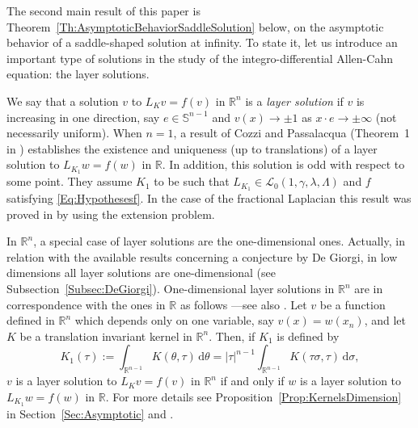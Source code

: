 \documentclass[12pt,reqno]{amsart}
\theoremstyle{definition}
\theoremstyle{remark}
\newcommand{\con}[1]{\mathbb{#1}}
\newcommand{\R}{\con{R}} %
\newcommand{\Sph}{\con{S}} %
\newcommand{\lcal}{\mathcal{L}}
\newcommand{\s}{\gamma}
\renewcommand{\d}{\,\mathrm{d}} %
\numberwithin{equation}{section}
\begin{document}
The second main result of this paper is Theorem~\ref{Th:AsymptoticBehaviorSaddleSolution} below, on the asymptotic behavior of a saddle-shaped solution at infinity. To state it, let us introduce an important type of solutions in the study of the integro-differential Allen-Cahn equation: the layer solutions.


We say that a solution $v$ to $L_K v = f(v)$ in $\R^n$ is a \emph{layer solution} if $v$ is increasing in one direction, say $e\in \Sph^{n-1}$ and $v(x) \to \pm 1$ as $x\cdot e \to \pm \infty$ (not necessarily uniform). When $n=1$, a result of Cozzi and Passalacqua (Theorem~1 in \cite{CozziPassalacqua}) establishes the existence and uniqueness (up to translations) of a layer solution to  $L_{K_1} w = f(w)$ in $\R$. In addition, this solution is odd with respect to some point. They assume $K_1$ to be such that $L_{K_1}\in \lcal_0(1,\s,\lambda, \Lambda)$ and $f$ satisfying \eqref{Eq:Hypothesesf}. In the case of the fractional Laplacian this result was proved in \cite{CabreSolaMorales,CabreSireII} by using the extension problem.

In $\R^n$, a special case of layer solutions are the one-dimensional ones. Actually, in relation with the available results concerning a conjecture by De Giorgi, in low dimensions all layer solutions are one-dimensional (see Subsection~\ref{Subsec:DeGiorgi}). One-dimensional layer solutions in $\R^n$ are in correspondence with the ones in $\R$ as follows ---see also \cite{CozziPassalacqua}. Let $v$ be a function defined in $\R^n$ which depends only on one variable, say $v(x) = w(x_n)$, and let $K$ be a translation invariant kernel in $\R^n$. Then, if $K_1$ is defined by
$$
K_1(\tau) := \int_{\R^{n-1}} K\left(\theta,\tau\right) \d \theta = |\tau|^{n-1} \int_{\R^{n-1}} K\left(\tau\sigma,\tau\right) \d \sigma,
$$ 
$v$ is a layer solution to $L_K v = f(v)$ in $\R^n$ if and only if $w$ is a layer solution to $L_{K_1} w = f(w)$ in $\R$. For more details see Proposition~\ref{Prop:KernelsDimension} in Section~\ref{Sec:Asymptotic} and \cite{CozziPassalacqua}. 
\end{document}
